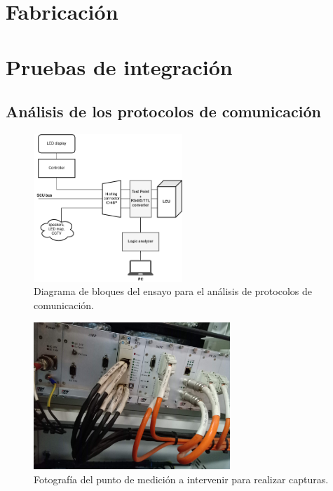 \documentclass[
11pt, %
]{charter}
\begin{document}
\pagebreak
\section{Fabricación}
\pagebreak
\section{Pruebas de integración}
\subsection{Análisis de los protocolos de comunicación}

\begin{figure}[htpb]
\centering 
\includegraphics[width=0.5\textwidth]{./Pics/sniffingDiagram.drawio.png}
\caption{Diagrama de bloques del ensayo para el análisis de protocolos de comunicación.}
\label{fig:sniffingDiagram}
\end{figure}


\begin{figure}[htpb]
\centering 
\includegraphics[width=0.66\textwidth]{./Pics/IMG_20210322_122403.jpg}
\caption{Fotografía del punto de medición a intervenir para realizar capturas.}
\label{fig:NOsniffingPhoto}
\end{figure}
\end{document}
